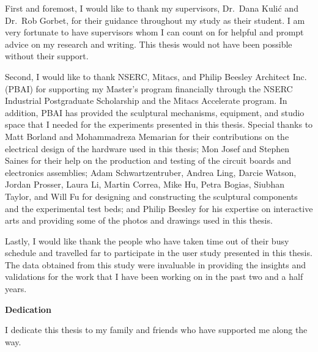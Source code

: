 First and foremost, I would like to thank my supervisors, Dr.~Dana Kuli\'{c} and Dr.~Rob Gorbet, for their guidance throughout my study as their student. I am very fortunate to have supervisors whom I can count on for helpful and prompt advice on my research and writing. This thesis would not have been possible without their support. 

Second, I would like to thank NSERC, Mitacs, and Philip Beesley Architect Inc. (PBAI) for supporting my Master's program financially through the NSERC Industrial Postgraduate Scholarship and the Mitacs Accelerate program. In addition, PBAI has provided the sculptural mechanisms, equipment, and studio space that I needed for the experiments presented in this thesis. Special thanks to Matt Borland and Mohammadreza Memarian for their contributions on the electrical design of the hardware used in this thesis; Mon Josef and Stephen Saines for their help on the production and testing of the circuit boards and electronics assemblies; Adam Schwartzentruber, Andrea Ling, Darcie Watson, Jordan Prosser, Laura Li, Martin Correa, Mike Hu, Petra Bogias, Siubhan Taylor, and Will Fu for designing and constructing the sculptural components and the experimental test beds; and Philip Beesley for his expertise on interactive arts and providing some of the photos and drawings used in this thesis. 

Lastly, I would like thank the people who have taken time out of their busy schedule and travelled far to participate in the user study presented in this thesis. The data obtained from this study were invaluable in providing the insights and validations for the work that I have been working on in the past two and a half years. 





\cleardoublepage


\begin{center}\textbf{Dedication}\end{center}

I dedicate this thesis to my family and friends who have supported me along the way.

\cleardoublepage

\renewcommand\contentsname{Table of Contents}
\tableofcontents
\cleardoublepage
{}

\listoftables
\cleardoublepage
{}		%

